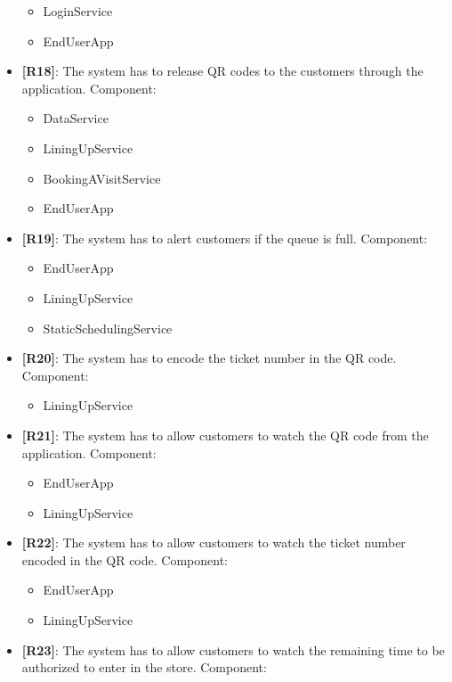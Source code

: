 \begin{itemize}
\begin{itemize}
        \item LoginService
        \item EndUserApp
    \end{itemize}
    \item {\textbf{[R18]}}: The system has to release QR codes to the customers through the application.
    Component:
    \begin{itemize}
        \item DataService
        \item LiningUpService
        \item BookingAVisitService
        \item EndUserApp
    \end{itemize}
    \item {\textbf{[R19]}}: The system has to alert customers if the queue is full.
    Component:
    \begin{itemize}
        \item EndUserApp
        \item LiningUpService
        \item StaticSchedulingService
    \end{itemize}
    \item {\textbf{[R20]}}: The system has to encode the ticket number in the QR code.
    Component:
    \begin{itemize}
        \item LiningUpService
    \end{itemize}
    \item {\textbf{[R21]}}: The system has to allow customers to watch the QR code from the application.
    Component:
    \begin{itemize}
        \item EndUserApp
        \item LiningUpService
    \end{itemize}
    \item {\textbf{[R22]}}: The system has to allow customers to watch the ticket number encoded in the QR code.
    Component:
    \begin{itemize}
        \item EndUserApp
        \item LiningUpService
    \end{itemize}
    \item {\textbf{[R23]}}: The system has to allow customers to watch the remaining time to be authorized to enter in the store.
    Component:
    \begin{itemize}

\end{itemize}
\end{itemize}
